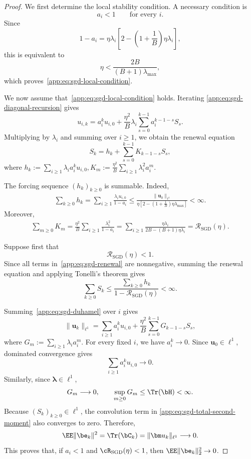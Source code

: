 \begin{proof}
We first determine the local stability condition. A necessary
condition is
\[
a_i<1
\qquad
\text{for every }i.
\]
Since
\[
1-a_i
=
\eta\lambda_i
\left[
2-\left(1+\frac1B\right)\eta\lambda_i
\right],
\]
this is equivalent to
\[
\eta
<
\frac{2B}{(B+1)\lambda_{\max}},
\]
which proves~\eqref{app:eq:sgd-local-condition}.

We now assume that~\eqref{app:eq:sgd-local-condition} holds. Iterating
\eqref{app:eq:sgd-diagonal-recursion} gives
\begin{equation}
\label{app:eq:sgd-duhamel}
u_{i,k}
=
a_i^k u_{i,0}
+
\frac{\eta^2}{B}\lambda_i
\sum_{s=0}^{k-1}
a_i^{k-1-s}S_s.
\end{equation}
Multiplying by $\lambda_i$ and summing over $i\geq1$, we obtain the
renewal equation
\begin{equation}
\label{app:eq:sgd-renewal}
S_k
=
h_k
+
\sum_{s=0}^{k-1}
K_{k-1-s}S_s,
\end{equation}
where
\(
h_k
:=
\sum_{i\geq1}
\lambda_i a_i^k u_{i,0},
K_m
:=
\frac{\eta^2}{B}
\sum_{i\geq1}
\lambda_i^2a_i^m.
\)

The forcing sequence $(h_k)_{k\geq0}$ is summable. Indeed,
\begin{align}
\sum_{k\geq0}h_k
=
\sum_{i\geq1}
\frac{\lambda_i u_{i,0}}{1-a_i}
\nonumber
\leq
\frac{\|\bm u_0\|_{\ell^1}}
{\eta\left[
2-(1+\frac1B)\eta\lambda_{\max}
\right]}
<\infty.
\end{align}
Moreover,
\begin{align}
\sum_{m\geq0}K_m
=
\frac{\eta^2}{B}
\sum_{i\geq1}
\frac{\lambda_i^2}{1-a_i}
\nonumber
=
\sum_{i\geq1}
\frac{\eta\lambda_i}
{2B-(B+1)\eta\lambda_i}
=
\mathcal R_{\mathrm{SGD}}(\eta).
\end{align}

Suppose first that
\[
\mathcal R_{\mathrm{SGD}}(\eta)<1.
\]
Since all terms in~\eqref{app:eq:sgd-renewal} are nonnegative,
summing the renewal equation and applying Tonelli's theorem gives
\[
\sum_{k\geq0}S_k
\leq
\frac{\sum_{k\geq0}h_k}
{1-\mathcal R_{\mathrm{SGD}}(\eta)}
<\infty.
\]

Summing~\eqref{app:eq:sgd-duhamel} over $i$ gives
\begin{equation}
\label{app:eq:sgd-total-second-moment}
\|\bm u_k\|_{\ell^1}
=
\sum_{i\geq1}a_i^ku_{i,0}
+
\frac{\eta^2}{B}
\sum_{s=0}^{k-1}
G_{k-1-s}S_s,
\end{equation}
where
\(
G_m
:=
\sum_{i\geq1}\lambda_i a_i^m.
\)
For every fixed $i$, we have $a_i^k\to0$. Since
$\bm u_0\in\ell^1$, dominated convergence gives
\[
\sum_{i\geq1}a_i^ku_{i,0}\longrightarrow0.
\]
Similarly, since $\bm\lambda\in\ell^1$,
\[
G_m\longrightarrow0,
\qquad
\sup_{m\geq0}G_m
\leq
\Tr(\bH)<\infty.
\]
Because $(S_k)_{k\geq0}\in\ell^1$, the convolution term in
\eqref{app:eq:sgd-total-second-moment} also converges to zero.
Therefore,
\[
\EE\|\be_k\|^2
=
\Tr(\bC_k)
=
\|\bm u_k\|_{\ell^1}
\longrightarrow0.
\]
This proves that, if \(a_i<1\) and \(\cR_{\mathrm{SGD}}(\eta)<1\), then \(\EE\|\be_k\|_{2}^2\to0\).


\end{proof}
